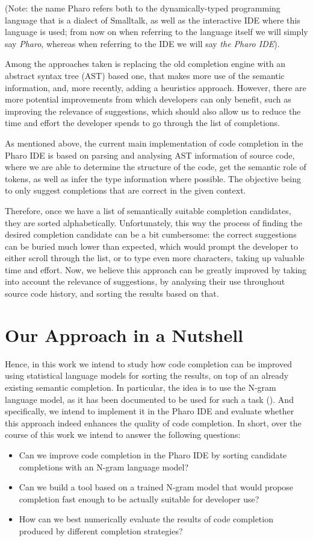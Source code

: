 (Note: the name Pharo refers both to the dynamically-typed programming language that is a dialect of Smalltalk, as well as the interactive IDE where this language is used; from now on when referring to the language itself we will simply say \textit{Pharo}, whereas when referring to the IDE we will say \textit{the Pharo IDE}).

Among the approaches taken is replacing the old completion engine with an abstract syntax tree (AST) based one, that makes more use of the semantic information, and, more recently, adding a heuristics approach. However, there are more potential improvements from which developers can only benefit, such as improving the relevance of suggestions, which should also allow us to reduce the time and effort the developer spends to go through the list of completions.

As mentioned above, the current main implementation of code completion in the Pharo IDE is based on parsing and analysing AST information of source code, where we are able to determine the structure of the code, get the semantic role of tokens, as well as infer the type information where possible. The objective being to only suggest completions that are correct in the given context.

Therefore, once we have a list of semantically suitable completion candidates, they are sorted alphabetically. Unfortunately, this way the process of finding the desired completion candidate can be a bit cumbersome: the correct suggestions can be buried much lower than expected, which would prompt the developer to either scroll through the list, or to type even more characters, taking up valuable time and effort. Now, we believe this approach can be greatly improved by taking into account the relevance of suggestions, by analysing their use throughout source code history, and sorting the results based on that.

\section{Our Approach in a Nutshell}
\label{sec:Introduction-Approach}
Hence, in this work we intend to study how code completion can be improved using statistical language models for sorting the results, on top of an already existing semantic completion. In particular, the idea is to use the N-gram language model, as it has been documented to be used for such a task (\cite{Hind12a}). And specifically, we intend to implement it in the Pharo IDE and evaluate whether this approach indeed enhances the quality of code completion. In short, over the course of this work we intend to answer the following questions:
\begin{itemize}
    \item Can we improve code completion in the Pharo IDE by sorting candidate completions with an N-gram language model?
    \item Can we build a tool based on a trained N-gram model that would propose completion fast enough to be actually suitable for developer use?
    \item How can we best numerically evaluate the results of code completion produced by different completion strategies?
\end{itemize}

